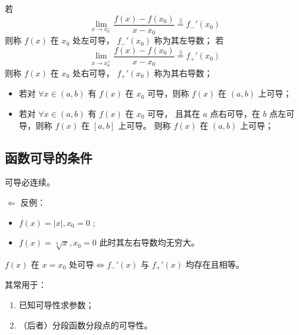 \begin{Def}[左、右导数]

    若$$
        {\displaystyle\lim_{x\rightarrow x_0^-}}\frac{f(x)-f(x_0)}{x-x_0}\mathop{=}\limits^\exists f_-'(x_0)
    $$ 
    则称 $ f(x) $ 在  $ x_0 $ 处左可导， $ f_-'(x_0) $ 称为其左导数；
    若$$
    {\displaystyle\lim_{x\rightarrow x_0^+}}\frac{f(x)-f(x_0)}{x-x_0}\mathop{=}\limits^\exists f_+'(x_0)
$$ 
则称 $ f(x) $ 在  $ x_0 $ 处右可导， $ f_+'(x_0) $ 称为其右导数；
\end{Def}

\begin{Field}[函数在区间上的可导性]

    \begin{itemize}
        \item 若对 $ \forall x\in (a,b) $ 有 $ f(x) $ 在 $ x_0 $ 可导，则称 $ f(x) $ 在 $ (a,b) $ 上可导；
        \item 若对 $ \forall x\in (a,b) $ 有 $ f(x) $ 在 $ x_0 $ 可导，
        且其在 $ a $ 点右可导，在 $ b $ 点左可导，则称 $ f(x) $ 在 $ [a,b] $ 上可导。
        则称 $ f(x) $ 在 $ (a,b) $ 上可导；
    \end{itemize}
\end{Field}

\subsection{函数可导的条件}

\begin{Theo}[函数可导的必要条件]

    可导必连续。
\end{Theo}
$ \Leftarrow $ 反例：
\begin{itemize}
    \item $ f(x)=|x|,x_0=0 $ ;
    \item $ f(x)=\sqrt[3]x,x_0=0 $ 此时其左右导数均无穷大。
\end{itemize}

\begin{Theo}[函数可导的充要条件]

    $ f(x) $ 在 $ x=x_0 $ 处可导$ \Leftrightarrow f_-'(x) $ 与 $ f_+'(x) $  均存在且相等。
\end{Theo}

其常用于：\begin{enumerate}
    \item 已知可导性求参数；
    \item （后者）分段函数分段点的可导性。
\end{enumerate}

